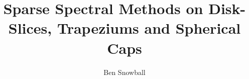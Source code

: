 \documentclass[a4paper,12pt,twoside]{report}
\begin{document}
\title{\LARGE {\bf Sparse Spectral Methods on Disk-Slices, Trapeziums and Spherical Caps}\\
 \vspace*{6mm}
}
\author{Ben Snowball}

\maketitle

\preface











\body







\appendix



%

\end{document}
